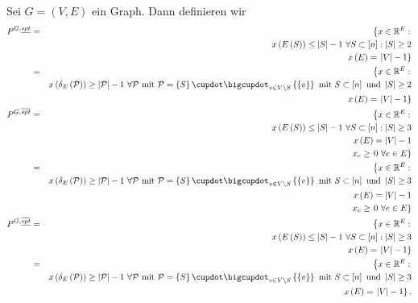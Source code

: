 \documentclass[10p,a4paper,BCOR = 12mm, DIV=15]{scrbook}
\begin{document}
{\begin{Def}
Sei $G=\left(V, E\right)$ ein Graph. Dann definieren wir
\begin{eqnarray*}
P^{G, \underline{spt}} & = &  \left\{ x \in \mathbb{R}^E: \right. \nonumber \\
& & x\left(E\left(S\right)\right) \leq \left|S\right|-1\ \forall S \subset \left[n\right]: \left|S\right| \geq 2 \\
& & x\left(E\right) = \left.\left|V\right|-1 \right\} \nonumber \\
& = & \left\{ x \in \mathbb{R}^E: \right. \nonumber \\
& & x\left(\delta_E\left(\mathcal{P}\right)\right) \geq \left|\mathcal{P}\right|-1\ \forall \mathcal{P} \textnormal{ mit } \mathcal{P} = \left\{S\right\} \cupdot \bigcupdot_{v \in V \backslash S} \left\{\left\{v\right\}\right\} \textnormal{ mit } S \subset \left[n\right] \textnormal{ und } \left|S\right| \geq 2 \\
& & x\left(E\right) = \left. \left|V\right|-1 \right\} \nonumber \\
P^{G, \overline{spt}} & = & \left\{ x \in \mathbb{R}^E: \right. \nonumber \\
& & x\left(E\left(S\right)\right) \leq \left|S\right|-1\ \forall S \subset \left[n\right]: \left|S\right| \geq 3 \\
& & x\left(E\right) = \left|V\right|-1 \nonumber \\
& & x_e \geq \left. 0\ \forall e \in E \right\} \nonumber \\
& = & \left\{ x \in \mathbb{R}^E: \right. \nonumber \\
& & x\left(\delta_E\left(\mathcal{P}\right)\right) \geq \left|\mathcal{P}\right|-1\ \forall \mathcal{P} \textnormal{ mit } \mathcal{P} = \left\{S\right\} \cupdot \bigcupdot_{v \in V \backslash S} \left\{\left\{v\right\}\right\} \textnormal{ mit } S \subset \left[n\right] \textnormal{ und } \left|S\right| \geq 3 \\
& & x\left(E\right) = \left|V\right|-1 \\
& & x_e \geq \left. 0\ \forall e \in E \right\} \nonumber \\
P^{G, \overline{\underline{spt}}} & = & \left\{ x \in \mathbb{R}^E: \right. \nonumber \\
& & x\left(E\left(S\right)\right) \leq \left|S\right|-1\ \forall S \subset \left[n\right]: \left|S\right| \geq 3 \\
& & x\left(E\right) =  \left.\left|V\right|-1 \nonumber \right\} \nonumber \\
& = & \left\{ x \in \mathbb{R}^E: \right. \nonumber \\
& & x\left(\delta_E\left(\mathcal{P}\right)\right) \geq \left|\mathcal{P}\right|-1\ \forall \mathcal{P} \textnormal{ mit } \mathcal{P} = \left\{S\right\} \cupdot \bigcupdot_{v \in V \backslash S} \left\{\left\{v\right\}\right\} \textnormal{ mit } S \subset \left[n\right] \textnormal{ und } \left|S\right| \geq 3 \\
& & x\left(E\right) = \left.\left|V\right|-1 \right\}. \nonumber
\end{eqnarray*}
\end{Def}

}
\end{document}
